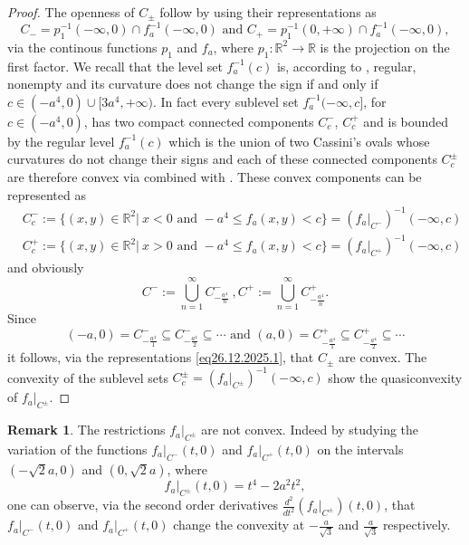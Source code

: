 \documentclass[12pt,twoside,reqno]{amsart}
\theoremstyle{definition}
\newtheorem{remark}{Remark}[section]
\numberwithin{equation}{section}
\begin{document}
\begin{proof}
The openness of $C_{\pm}$ follow by using their representations as 
\[C_-=p_1^{-1}(-\infty,0)\cap f_a^{-1}(-\infty,0)\mbox{ and }C_+=p_1^{-1}(0,+\infty)\cap f_a^{-1}(-\infty,0),\] 
via the continous functions $p_1$ and $f_a$, where $p_1:\mathbb{R}^2\longrightarrow\mathbb{R}$ is the projection on the first factor.
We recall that the level set $f_a^{-1}(c)$ is, according to \cite{PiTo}, regular, nonempty 
and its curvature does not change the sign if and only if $c\in(-a^4,0)\cup[3a^4,+\infty)$. In fact every sublevel set $f_a^{-1}(-\infty,c]$, 
for $c\in(-a^4,0)$, has two compact connected components $C^{-}_c$, $C^{+}_c$ and is bounded by the regular level $f_a^{-1}(c)$ which is the union of two Cassini's 
ovals whose curvatures do not change their signs and each of these connected components $C^{\pm}_c$ are therefore convex via \cite[Proposition 1, p. 397]{Carmo} combined with 
\cite[Formula 3.7]{Goldman} . These convex components 
can be represented as 
\begin{align}
& C^{-}_c:=\{(x,y)\in\mathbb{R}^2| \ x<0 \mbox{ and }-a^4\leq f_a(x,y)<c\}=(f_a\big|_{C^{-}})^{-1}(-\infty,c)\nonumber \\
& C^{+}_c:=\{(x,y)\in\mathbb{R}^2| \ x>0 \mbox{ and }-a^4\leq f_a(x,y)<c\}=(f_a\big|_{C^{+}})^{-1}(-\infty,c) \nonumber
\end{align}
and obviously 
\begin{equation}
C^-:=\bigcup_{n=1}^\infty C^-_{-\frac{a^4}{n}}\ , C^+:=\bigcup_{n=1}^\infty C^+_{-\frac{a^4}{n}}. \label{eq26.12.2025.1}
\end{equation}
Since 
\[(-a,0)=C^-_{-\frac{a^4}{1}}\subseteq C^-_{-\frac{a^4}{2}}\subseteq \cdots\mbox{ and }(a,0)=C^+_{-\frac{a^4}{1}}\subseteq C^+_{-\frac{a^4}{2}}\subseteq \cdots \]
it follows, via the representations \eqref{eq26.12.2025.1}, that $C_{\pm}$ are convex. The convexity of the sublevel sets $C^{\pm}_c=(f_a\big|_{C^{\pm}})^{-1}(-\infty,c)$ 
show the quasiconvexity of $f_a\big|_{C^{\pm}}$.
\end{proof}
\begin{remark}
The restrictions $f_a\big|_{C^{\pm}}$ are not convex. Indeed by studying the variation of the functions 
$f_a\big|_{C^{-}}(t,0)$ and $f_a\big|_{C^{+}}(t,0)$ on the intervals $(-\sqrt{2}a,0)$ and $(0,\sqrt{2}a)$, where 
\[f_a\big|_{C^{\pm}}(t,0)=t^4-2a^2t^2,\] one can observe, via the second order derivatives $\frac{d^2}{dt^2}(f_a\big|_{C^{\pm}})(t,0)$, that
$f_a\big|_{C^{-}}(t,0)$ and $f_a\big|_{C^{+}}(t,0)$ change the convexity at $-\frac{a}{\sqrt{3}}$ and $\frac{a}{\sqrt{3}}$ respectively.
\end{remark}

\vskip 6mm




\end{document}
